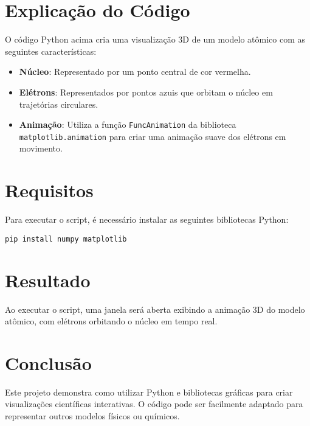 \documentclass{article}
\begin{document}
\section{Explicação do Código}
O código Python acima cria uma visualização 3D de um modelo atômico com as seguintes características:

\begin{itemize}
    \item \textbf{Núcleo}: Representado por um ponto central de cor vermelha.
    \item \textbf{Elétrons}: Representados por pontos azuis que orbitam o núcleo em trajetórias circulares.
    \item \textbf{Animação}: Utiliza a função \texttt{FuncAnimation} da biblioteca \texttt{matplotlib.animation} para criar uma animação suave dos elétrons em movimento.
\end{itemize}

\section{Requisitos}
Para executar o script, é necessário instalar as seguintes bibliotecas Python:

\begin{verbatim}
pip install numpy matplotlib
\end{verbatim}

\section{Resultado}
Ao executar o script, uma janela será aberta exibindo a animação 3D do modelo atômico, com elétrons orbitando o núcleo em tempo real.

\section{Conclusão}
Este projeto demonstra como utilizar Python e bibliotecas gráficas para criar visualizações científicas interativas. O código pode ser facilmente adaptado para representar outros modelos físicos ou químicos.
\end{document}
